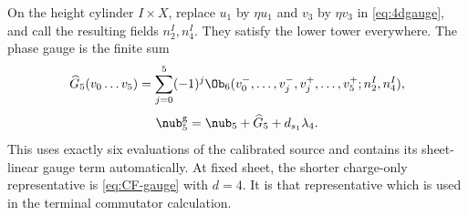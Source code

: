 On the height cylinder $I\times X$, replace $u_1$ by $\eta u_1$ and $v_3$ by $\eta v_3$ in \eqref{eq:4dgauge}, and call the resulting fields $n_2^I,n_4^I$. They satisfy the lower tower everywhere. The phase gauge is the finite sum
\begin{equation}\label{eq:G5cylinder}
 \widehat G_5(v_0\ldots v_5)
 =\sum_{j=0}^5(-1)^j
 \Ob_6(v_0^-,\ldots,v_j^-,v_j^+,\ldots,v_5^+;n_2^I,n_4^I),
\end{equation}
\begin{equation}\label{eq:4d-phase-gauge}
 \nub_5^{\mathrm g}=\nub_5+\widehat G_5+d_{s_1}\lambda_4.
\end{equation}
This uses exactly six evaluations of the calibrated source and contains its sheet-linear gauge term automatically. At fixed sheet, the shorter charge-only representative is \eqref{eq:CF-gauge} with $d=4$. It is that representative which is used in the terminal commutator calculation.
